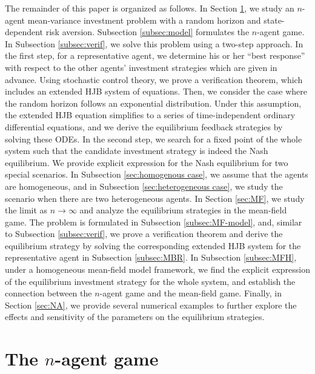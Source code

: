 \documentclass[11pt]{article}
\numberwithin{equation}{section}
\begin{document}
The remainder of this paper is organized as follows. In Section \ref{sec:ngame}, we study an $n$-agent mean-variance investment problem with a random horizon and state-dependent risk aversion. Subsection \ref{subsec:model} formulates the $n$-agent game. In Subsection \ref{subsec:verif}, we solve this problem using a two-step approach. In the first step, for a representative agent, we determine his or her ``best response'' with respect to the other agents' investment strategies which are given in advance. Using stochastic control theory, we prove a verification theorem, which includes an extended HJB system of equations. Then, we consider the case where the random horizon follows an exponential distribution. Under this assumption, the extended HJB equation simplifies to a series of time-independent ordinary differential equations, and we derive the equilibrium feedback strategies by solving these ODEs. In the second step, we search for a fixed point of the whole system such that the candidate investment strategy is indeed the Nash equilibrium. We provide explicit expression for the Nash equilibrium for two special scenarios. In Subsection \ref{sec:homogenous case}, we assume that the agents are homogeneous, and in Subsection \ref{sec:heterogeneous case}, we study the scenario when there are two heterogeneous agents. In Section \ref{sec:MF}, we study the limit as $n \to \infty$ and analyze the equilibrium strategies in the mean-field game. The problem is formulated in Subsection \ref{subsec:MF-model}, and, similar to Subsection \ref{subsec:verif}, we prove a verification theorem and derive the equilibrium strategy by solving the corresponding extended HJB system for the representative agent in Subsection \ref{subsec:MBR}. In Subsection \ref{subsec:MFH}, under a homogeneous mean-field model framework, we find the explicit expression of the equilibrium investment strategy for the whole system, and establish the connection between the $n$-agent game and the mean-field game. Finally, in Section \ref{sec:NA}, we provide several numerical examples to further explore the effects and sensitivity of the parameters on the equilibrium strategies.
	
	
	\section{The $n$-agent game}\label{sec:ngame}
	
\end{document}
